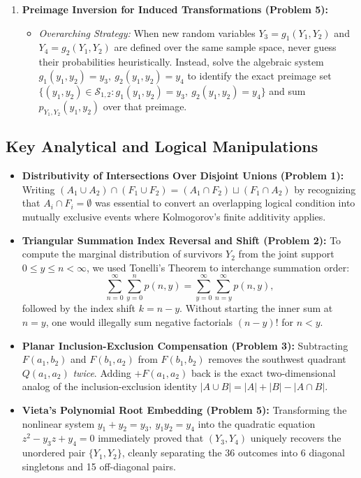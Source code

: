 \documentclass[11pt, letterpaper]{article}
\theoremstyle{definition}
\theoremstyle{remark}
\begin{document}
\begin{enumerate}[label=\textbf{\arabic*.}]
    \item \textbf{Preimage Inversion for Induced Transformations (Problem 5):}
    \begin{itemize}
        \item \emph{Overarching Strategy:} When new random variables $Y_3 = g_1(Y_1, Y_2)$ and $Y_4 = g_2(Y_1, Y_2)$ are defined over the same sample space, never guess their probabilities heuristically. Instead, solve the algebraic system $g_1(y_1, y_2) = y_3,\ g_2(y_1, y_2) = y_4$ to identify the exact preimage set $\{(y_1, y_2) \in \mathcal{S}_{1,2} : g_1(y_1, y_2) = y_3,\ g_2(y_1, y_2) = y_4\}$ and sum $p_{Y_1, Y_2}(y_1, y_2)$ over that preimage.
    \end{itemize}
\end{enumerate}

\subsection{Key Analytical and Logical Manipulations}

\begin{itemize}
    \item \textbf{Distributivity of Intersections Over Disjoint Unions (Problem 1):} Writing $(A_1 \cup A_2) \cap (F_1 \cup F_2) = (A_1 \cap F_2) \sqcup (F_1 \cap A_2)$ by recognizing that $A_i \cap F_i = \emptyset$ was essential to convert an overlapping logical condition into mutually exclusive events where Kolmogorov's finite additivity applies.
    \item \textbf{Triangular Summation Index Reversal and Shift (Problem 2):} To compute the marginal distribution of survivors $Y_2$ from the joint support $0 \le y \le n < \infty$, we used Tonelli's Theorem to interchange summation order:
    \[
    \sum_{n=0}^{\infty} \sum_{y=0}^{n} p(n, y) = \sum_{y=0}^{\infty} \sum_{n=y}^{\infty} p(n, y),
    \]
    followed by the index shift $k = n - y$. Without starting the inner sum at $n = y$, one would illegally sum negative factorials $(n-y)!$ for $n < y$.
    \item \textbf{Planar Inclusion-Exclusion Compensation (Problem 3):} Subtracting $F(a_1, b_2)$ and $F(b_1, a_2)$ from $F(b_1, b_2)$ removes the southwest quadrant $Q(a_1, a_2)$ \emph{twice}. Adding $+F(a_1, a_2)$ back is the exact two-dimensional analog of the inclusion-exclusion identity $|A \cup B| = |A| + |B| - |A \cap B|$.
    \item \textbf{Vieta's Polynomial Root Embedding (Problem 5):} Transforming the nonlinear system $y_1 + y_2 = y_3,\ y_1 y_2 = y_4$ into the quadratic equation $z^2 - y_3 z + y_4 = 0$ immediately proved that $(Y_3, Y_4)$ uniquely recovers the unordered pair $\{Y_1, Y_2\}$, cleanly separating the 36 outcomes into 6 diagonal singletons and 15 off-diagonal pairs.
\end{itemize}
\end{document}
